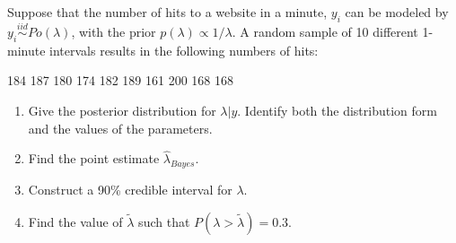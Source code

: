   \item 
    Suppose that the number of hits to a website in a minute, $y_i$ can be modeled by $y_i\stackrel{iid}{\sim}Po(\lambda)$, with the prior  $p(\lambda) \propto 1/ \lambda$. A random sample of 10 different 1-minute intervals results in the following numbers of hits: 
    
    184	187	180	174	182	189	161	200	168	168
    
    \begin{enumerate}
      \item Give the posterior distribution for $ \lambda | y$. Identify both the distribution form and the values of the parameters. 
      \item Find the point estimate $\hat{\lambda}_{Bayes}$. 
      \item Construct a 90\% credible interval for $\lambda$. 
      \item Find the value of $\tilde{\lambda}$ such that $P(\lambda>\tilde{\lambda})=0.3$.
\end{enumerate}

